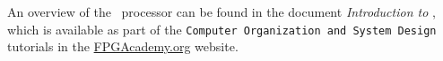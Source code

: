 
An overview of the \processor~processor can be found in the document {\it Introduction to 
\processor}, which is available as part of the \texttt{Computer Organization and System Design}
tutorials in the {\small \href{https://www.fpgacademy.org/tutorials.html} {FPGAcademy.org}} 
website.

